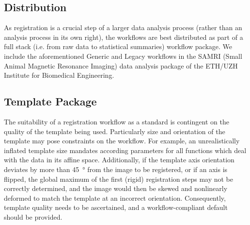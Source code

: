 
\subsection{Distribution}

As registration is a crucial step of a larger data analysis process (rather than an analysis process in its own right), the workflows are best distributed as part of a full stack (i.e. from raw data to statistical summaries) workflow package.
We include the aforementioned Generic and Legacy workflows in the SAMRI (Small Animal Magnetic Resonance Imaging) data analysis package \cite{samri} of the ETH/UZH Institute for Biomedical Engineering.

\subsection{Template Package}


The suitability of a registration workflow as a standard is contingent on the quality of the template being used.
Particularly size and orientation of the template may pose constraints on the workflow.
For example, an unrealistically inflated template size mandates according parameters for all functions which deal with the data in its affine space.
Additionally, if the template axis orientation deviates by more than \SI{45}{\degree} from the image to be registered, or if an axis is flipped, the global maximum of the first (rigid) registration steps may not be correctly determined, and the image would then be skewed and nonlinearly deformed to match  the template at an incorrect orientation.
Consequently, template quality needs to be ascertained, and a workflow-compliant default should be provided.

